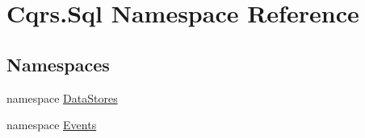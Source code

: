 \hypertarget{namespaceCqrs_1_1Sql}{}\section{Cqrs.\+Sql Namespace Reference}
\label{namespaceCqrs_1_1Sql}
\subsection*{Namespaces}
\begin{DoxyCompactItemize}
\item 
namespace \hyperlink{namespaceCqrs_1_1Sql_1_1DataStores}{Data\+Stores}
\item 
namespace \hyperlink{namespaceCqrs_1_1Sql_1_1Events}{Events}
\end{DoxyCompactItemize}
